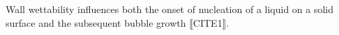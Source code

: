 Wall wettability influences both the onset of nucleation of a liquid on a solid surface and the subsequent bubble growth ⟦CITE1⟧.
